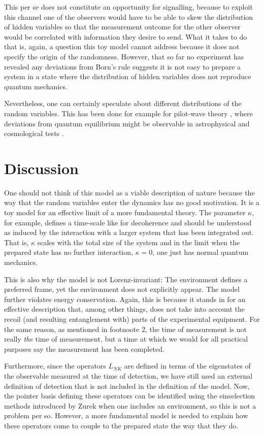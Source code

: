 \documentclass[12pt]{article}
\begin{document}
This per se does not constitute an opportunity for signalling, because to exploit this channel one of the observers would have to be able to skew the distribution of hidden variables so that the measurement outcome for the other observer would be correlated with information they desire to send. What it takes to do that is, again, a question this toy model cannot address because it does not specify the origin of the randomness. However,  that so far no experiment has revealed any deviations from Born's rule suggests it is not easy to prepare a system in a state where the distribution of hidden variables does not reproduce quantum mechanics. 

Nevertheless, one can certainly speculate about different distributions of the random variables. This has been done for example for pilot-wave theory \cite{Val1,Val2,Val3}, where deviations from quantum equilibrium might be observable in astrophysical
and cosmological tests \cite{Val4,Val5}.

\section{Discussion}


One should not think of this model as a viable description of nature because the way that the random variables enter the dynamics has no good motivation. It is a toy model for an effective limit of a more fundamental theory. The parameter $\kappa$, for example, defines a time-scale like for decoherence and should be understood as induced by the interaction with a larger system that has been integrated out. That is, $\kappa$ scales with the total size of the system and in the limit when the prepared state has no further interaction, $\kappa = 0$, one just has normal quantum mechanics. 


This is also why the model is not Lorenz-invariant: The environment defines a preferred frame, yet the environment does not explicitly appear. The model further violates energy conservation. Again, this is because it stands in for an effective description that, among other things, does not take into account the recoil (and resulting entanglement with) parts of the experimental equipment. For the same reason, as mentioned in footnoote 2, the time of measurement is not really {\emph{the}} time of measurement, but a time at which we would for all practical purposes say the measurement has been completed. 

Furthermore, since the operators $L_{NK}$ are defined in terms of the eigenstates of the observable measured at the time of detection, we have still used an external definition of detection that is not included in the definition of the model. Now, the pointer basis defining these operators can be identified using the einselection methods introduced by Zurek \cite{Zurek} when one includes an environment, so this is not a problem per so. However, a more fundamental model is needed to explain how these operators come to couple to the prepared state the way that they do. 
\end{document}
